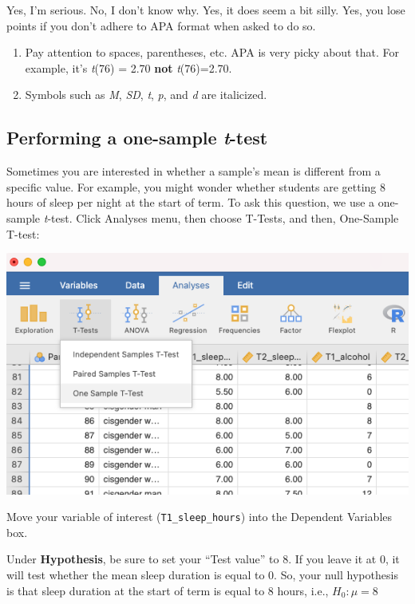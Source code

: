 \documentclass[
]{book}
\begin{document}
Yes, I'm serious. No, I don't know why. Yes, it does seem a bit silly. Yes, you lose points if you don't adhere to APA format when asked to do so.

\begin{enumerate}
\def\labelenumi{\arabic{enumi}.}
\setcounter{enumi}{3}
\item
  Pay attention to spaces, parentheses, etc. APA is very picky about that. For example, it's \emph{t}(76) = 2.70 \textbf{not} \emph{t}(76)=2.70.
\item
  Symbols such as \emph{M}, \emph{SD}, \emph{t}, \emph{p}, and \emph{d} are italicized.
\end{enumerate}

\hypertarget{performing-a-one-sample-t-test}{%
\subsection{\texorpdfstring{Performing a one-sample \emph{t}-test}{Performing a one-sample t-test}}\label{performing-a-one-sample-t-test}}

Sometimes you are interested in whether a sample's mean is different from a specific value. For example, you might wonder whether students are getting 8 hours of sleep per night at the start of term. To ask this question, we use a one-sample \emph{t}-test. Click {Analyses} menu, then choose {T-Tests}, and then, {One-Sample T-test}:

\includegraphics{img/onesample.png}

Move your variable of interest (\texttt{T1\_sleep\_hours}) into the Dependent Variables box.

Under \textbf{Hypothesis}, be sure to set your ``Test value'' to 8. If you leave it at 0, it will test whether the mean sleep duration is equal to 0. So, your null hypothesis is that sleep duration at the start of term is equal to 8 hours, i.e., \(H_0: \mu = 8\)
\end{document}
